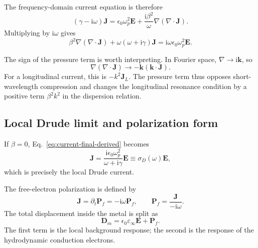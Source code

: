 \documentclass[11pt,a4paper]{article}
\newcommand{\E}{\mathbf E}
\newcommand{\Dfield}{\mathbf D}
\newcommand{\J}{\mathbf J}
\newcommand{\Pfield}{\mathbf P}
\newcommand{\ii}{\mathrm i}
\newcommand{\epsinf}{\varepsilon_\infty}
\newcommand{\omegap}{\omega_p}
\begin{document}
The frequency-domain current equation is therefore
\begin{equation}
    (\gamma-\ii\omega)\J
    =\epsilon_0\omegap^2\E
    +\frac{\ii\beta^2}{\omega}
      \nabla\!\left(\nabla\!\cdot\!\J\right).
    \label{eq:current-before-final}
\end{equation}
Multiplying by \(\ii\omega\) gives
\begin{equation}
    \boxed{
    \beta^2\nabla\!\left(\nabla\!\cdot\!\J\right)
    +\omega(\omega+\ii\gamma)\J
    =\ii\omega\epsilon_0\omegap^2\E.
    }
    \label{eq:current-final-derived}
\end{equation}

The sign of the pressure term is worth interpreting.  In Fourier space,
\(\nabla\to\ii\mathbf k\), so
\begin{equation}
    \nabla(\nabla\!\cdot\!\J)
    \longrightarrow
    -\mathbf k(\mathbf k\!\cdot\!\J).
    \label{eq:grad-div-fourier}
\end{equation}
For a longitudinal current, this is \(-k^2\J_L\).  The pressure term thus
opposes short-wavelength compression and changes the longitudinal resonance
condition by a positive term \(\beta^2 k^2\) in the dispersion relation.

\subsection{Local Drude limit and polarization form}

If \(\beta=0\), Eq.~\eqref{eq:current-final-derived} becomes
\begin{equation}
    \J=\frac{\ii\epsilon_0\omegap^2}{\omega+\ii\gamma}\E
    \equiv\sigma_D(\omega)\E,
    \label{eq:drude-from-hdm}
\end{equation}
which is precisely the local Drude current.

The free-electron polarization is defined by
\begin{equation}
    \J=\partial_t\Pfield_f=-\ii\omega\Pfield_f,
    \qquad
    \Pfield_f=\frac{\J}{-\ii\omega}.
    \label{eq:free-polarization-current}
\end{equation}
The total displacement inside the metal is split as
\begin{equation}
    \Dfield_m
    =\epsilon_0\epsinf\E+\Pfield_f.
    \label{eq:D-split}
\end{equation}
The first term is the local background response; the second is the response
of the hydrodynamic conduction electrons.
\end{document}
